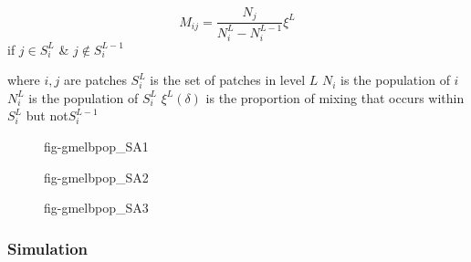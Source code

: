 \documentclass[
  letterpaper,
  DIV=11,
  numbers=noendperiod]{scrartcl}
\begin{document}
\[M_{ij} = \frac{N_{j}}{N_{i}^{L} - N_{i}^{L-1}} \xi^{L}\] if
\(j \in S_{i}^{L}\) \& \(j \notin S_{i}^{L-1}\)

where \(i, j\) are patches \(S_{i}^{L}\) is the set of patches in level
\(L\) \(N_i\) is the population of \(i\) \(N_{i}^{L}\) is the population
of \(S_{i}^{L}\) \(\xi^{L}(\delta)\) is the proportion of mixing that
occurs within \(S_{i}^{L}\) but not\(S_{i}^{L-1}\)

\begin{figure}

\begin{minipage}[t]{0.50\linewidth}

{\centering 


\caption{\label{fig-gmelbpop-1}fig-gmelbpop\_SA1}

}

\end{minipage}%
%
\begin{minipage}[t]{0.50\linewidth}

{\centering 


\caption{\label{fig-gmelbpop-2}fig-gmelbpop\_SA2}

}

\end{minipage}%
\newline
\begin{minipage}[t]{0.50\linewidth}

{\centering 


\caption{\label{fig-gmelbpop-3}fig-gmelbpop\_SA3}

}

\end{minipage}%

\end{figure}

\hypertarget{simulation}{%
\subsubsection{Simulation}\label{simulation}}
\end{document}
